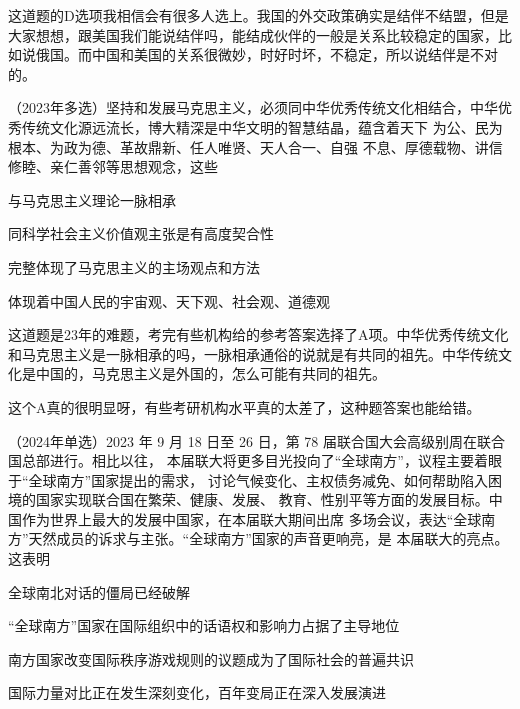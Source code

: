 \documentclass[lang=cn,blue,10pt,scheme=chinese,twocol]{zznote}
\begin{document}
\begin{solution}
	这道题的D选项我相信会有很多人选上。我国的外交政策确实是结伴不结盟，但是大家想想，跟美国我们能说结伴吗，能结成伙伴的一般是关系比较稳定的国家，比如说俄国。而中国和美国的关系很微妙，时好时坏，不稳定，所以说结伴是不对的。
\end{solution}
\begin{example} （2023年多选）坚持和发展马克思主义，必须同中华优秀传统文化相结合，中华优 秀传统文化源远流长，博大精深是中华文明的智慧结晶，蕴含着天下  为公、民为根本、为政为德、革故鼎新、任人唯贤、天人合一、自强
	不息、厚德载物、讲信修睦、亲仁善邻等思想观念，这些
	\begin{choice}
		\item  与马克思主义理论一脉相承
		\item 同科学社会主义价值观主张是有高度契合性
		\item 完整体现了马克思主义的主场观点和方法
		\item 体现着中国人民的宇宙观、天下观、社会观、道德观
	\end{choice}
\end{example}
\begin{solution}
	这道题是23年的难题，考完有些机构给的参考答案选择了A项。中华优秀传统文化和马克思主义是一脉相承的吗，一脉相承通俗的说就是有共同的祖先。中华传统文化是中国的，马克思主义是外国的，怎么可能有共同的祖先。
\end{solution}
\begin{remark}
	这个A真的很明显呀，有些考研机构水平真的太差了，这种题答案也能给错。
\end{remark}
\begin{example}	（2024年单选）2023 年 9 月 18 日至 26 日，第 78 届联合国大会高级别周在联合国总部进行。相比以往， 本届联大将更多目光投向了“全球南方”，议程主要着眼于“全球南方”国家提出的需求， 讨论气候变化、主权债务减免、如何帮助陷入困境的国家实现联合国在繁荣、健康、发展、 教育、性别平等方面的发展目标。中国作为世界上最大的发展中国家，在本届联大期间出席 多场会议，表达“全球南方”天然成员的诉求与主张。“全球南方”国家的声音更响亮，是 本届联大的亮点。这表明
	\begin{choice}
		\item 全球南北对话的僵局已经破解
		\item “全球南方”国家在国际组织中的话语权和影响力占据了主导地位
		\item 南方国家改变国际秩序游戏规则的议题成为了国际社会的普遍共识
		\item 国际力量对比正在发生深刻变化，百年变局正在深入发展演进
	\end{choice}
\end{example}
\end{document}
